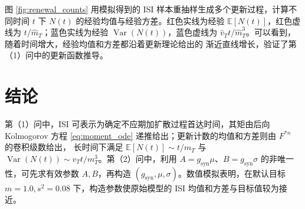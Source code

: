 \documentclass[UTF8]{ctexart}
\begin{document}
图 \ref{fig:renewal_counts} 用模拟得到的 ISI 样本重抽样生成多个更新过程，计算不同时间 $t$
下 $N(t)$ 的经验均值与经验方差。红色实线为经验 $\mathbb E[N(t)]$，红色虚线为
$t/\widehat m_T$；蓝色实线为经验 $\operatorname{Var}(N(t))$，蓝色虚线为
$\widehat v_Tt/\widehat m_T^3$。可以看到，随着时间增大，经验均值和方差都沿着更新理论给出的
渐近直线增长，验证了第（1）问中的更新函数推导。

\section{结论}

第（1）问中，ISI 可表示为确定不应期加扩散过程首达时间，其矩由后向 Kolmogorov 方程
\eqref{eq:moment_ode} 递推给出；更新计数的均值和方差则由 $F^{*n}$ 的卷积级数给出，
长时间下满足 $\mathbb E[N(t)]\sim t/m_T$ 与
$\operatorname{Var}(N(t))\sim v_Tt/m_T^3$。第（2）问中，利用
$A=g_{\mathrm{syn}}\mu$、$B=g_{\mathrm{syn}}\sigma$ 的非唯一性，可先求有效参数
$A,B$，再构造 $(g_{\mathrm{syn}},\mu,\sigma)$。数值模拟表明，在默认目标
$m=1.0,s^2=0.08$ 下，构造参数使原始模型的 ISI 均值和方差与目标值较为接近。
\end{document}
